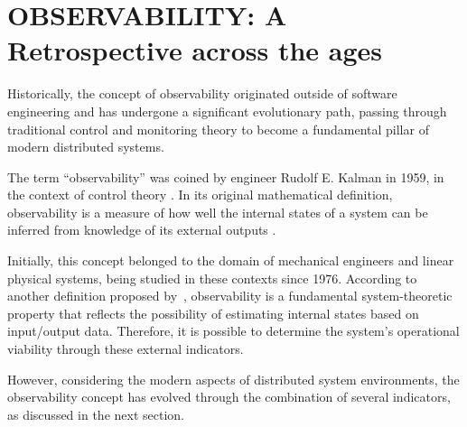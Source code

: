 \chapter{OBSERVABILITY: A Retrospective across the ages}
\label{chap:observability}

Historically, the concept of observability originated outside of software engineering and has undergone a significant evolutionary path, passing through traditional control and monitoring theory to become a fundamental pillar of modern distributed systems.

The term ``observability'' was coined by engineer Rudolf E. Kalman in 1959, in the context of control theory \cite{flanders_2024, majors_2022}. In its original mathematical definition, observability is a measure of how well the internal states of a system can be inferred from knowledge of its external outputs \cite{kalman_1959}.

Initially, this concept belonged to the domain of mechanical engineers and linear physical systems, being studied in these contexts since 1976. According to another definition proposed by~, observability is a fundamental system-theoretic property that reflects the possibility of estimating internal states based on input/output data. Therefore, it is possible to determine the system's operational viability through these external indicators.

However, considering the modern aspects of distributed system environments, the observability concept has evolved through the combination of several indicators, as discussed in the next section.



